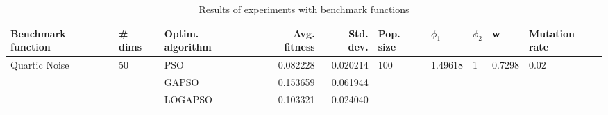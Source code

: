 \begin{table}
\centering
\caption{Results of experiments with benchmark functions}
\begin{tabular}{lllrrlllll}
\toprule
            Benchmark function &             \# dims & Optim. algorithm &  Avg. fitness &  Std. dev. &            Pop. size &               $\phi_{1}$ &         $\phi_{2}$ &                       w &         Mutation rate \\
\midrule
\multirow{3}{*}{Quartic Noise} & \multirow{3}{*}{50} &              PSO &      0.082228 &   0.020214 & \multirow{3}{*}{100} & \multirow{3}{*}{1.49618} & \multirow{3}{*}{1} & \multirow{3}{*}{0.7298} & \multirow{3}{*}{0.02} \\
                               &                     &            GAPSO &      0.153659 &   0.061944 &                      &                          &                    &                         &                       \\
                               &                     &          LOGAPSO &      0.103321 &   0.024040 &                      &                          &                    &                         &                       \\
\bottomrule
\end{tabular}
\end{table}
